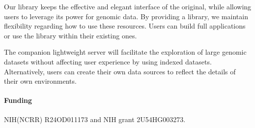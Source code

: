 \documentclass{bioinfo}
\begin{document}
Our library keeps the effective and elegant interface of the original,
while allowing users to leverage its power for genomic data. By providing a
library, we maintain flexibility regarding how to use these resources. Users
can build full applications or use the library within their existing ones.

The companion lightweight server will facilitate the exploration of large
genomic datasets without affecting user experience by using indexed datasets.
Alternatively, users can create their own data sources to reflect the details
of their own environments.

\paragraph{Funding\textcolon} NIH(NCRR) R24OD011173 and NIH grant 2U54HG003273.


\end{document}
